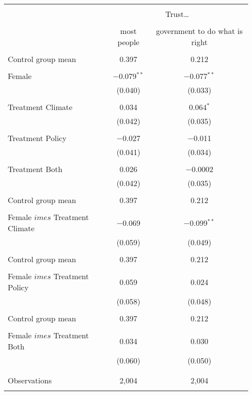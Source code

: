 
\begin{tabular}{@{\extracolsep{5pt}}lcc} 
\\[-1.8ex]\hline 
\hline \\[-1.8ex] 
 & \multicolumn{2}{c}{Trust…} \\ 
\cline{2-3} 
\\[-1.8ex] & most people & government to do what is right \\ 
\hline \\[-1.8ex] 
 Control group mean & 0.397 & 0.212  \\ \hline \\[-1.8ex] Female & $-$0.079$^{**}$ & $-$0.077$^{**}$ \\ 
  & (0.040) & (0.033) \\ 
  & & \\ 
 Treatment Climate & 0.034 & 0.064$^{*}$ \\ 
  & (0.042) & (0.035) \\ 
  & & \\ 
 Treatment Policy & $-$0.027 & $-$0.011 \\ 
  & (0.041) & (0.034) \\ 
  & & \\ 
 Treatment Both & 0.026 & $-$0.0002 \\ 
  & (0.042) & (0.035) \\ 
  & & \\ 
 Control group mean & 0.397 & 0.212  \\ \hline \\[-1.8ex] Female $	imes$ Treatment Climate & $-$0.069 & $-$0.099$^{**}$ \\ 
  & (0.059) & (0.049) \\ 
  & & \\ 
 Control group mean & 0.397 & 0.212  \\ \hline \\[-1.8ex] Female $	imes$ Treatment Policy & 0.059 & 0.024 \\ 
  & (0.058) & (0.048) \\ 
  & & \\ 
 Control group mean & 0.397 & 0.212  \\ \hline \\[-1.8ex] Female $	imes$ Treatment Both & 0.034 & 0.030 \\ 
  & (0.060) & (0.050) \\ 
  & & \\ 
\hline \\[-1.8ex] 

Observations & 2,004 & 2,004 \\ 
\hline 
\hline \\[-1.8ex] 
\end{tabular} 